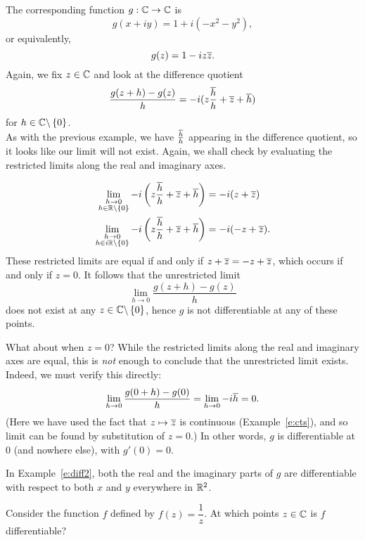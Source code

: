 \begin{solution}
The corresponding function $g: \mathbb{C} \to \mathbb{C}$ is
\[
g(x+iy) = 1+i(-x^2-y^2),
\]
or equivalently,
\[
g(z) = 1-i z \overline{z}.
\]
Again, we fix $z \in \mathbb{C}$ and look at the difference quotient
\[
\frac{g(z+h)-g(z)}{h} = -i(z \frac{\overline{h}}{h}+\overline{z}+\overline{h})
\]
for $h \in \mathbb{C} \backslash \left\{0\right\}$.\\

As with the previous example, we have $\frac{\overline{h}}{h}$ appearing in the difference quotient, so it looks like our limit will not exist.  Again, we shall check by evaluating the restricted limits along the real and imaginary axes.

\begin{align*}
\displaystyle \lim_{\substack{h \to 0 \\ h \in \mathbb{R} \backslash \left\{0\right\}}} -i \left( z \frac{\overline{h}}{h} + \overline{z} + \overline{h} \right) & = -i(z + \overline{z} ) \\
\displaystyle \lim_{\substack{h \to 0 \\ h \in i\mathbb{R} \backslash \left\{0\right\}}} -i \left( z \frac{\overline{h}}{h} + \overline{z} + \overline{h} \right) & = -i (-z+\overline{z} ).
\end{align*}
These restricted limits are equal if and only if $z+\overline{z} = -z + \overline{z}$, which occurs if and only if $z=0$.  It follows that the unrestricted limit
\[
\lim_{h \to 0} \frac{g(z+h)-g(z)}{h}
\]
does not exist at any $z \in \mathbb{C} \backslash \left\{0\right\}$, hence $g$ is not differentiable at any of these points.

What about when $z=0$?  While the restricted limits along the real and imaginary axes are equal, this is \emph{not} enough to conclude that the unrestricted limit exists.  Indeed, we must verify this directly:
\[
\lim_{h \to 0} \frac{g(0+h)-g(0)}{h} = \lim_{h \to 0} -i \overline{h} = 0.
\]
(Here we have used the fact that $z \mapsto \overline{z}$ is continuous (Example~\ref{e:cts}), and so limit can be found by substitution of $z=0$.)  In other words, $g$ is differentiable at $0$ (and nowhere else), with $g'(0)=0$.
\end{solution}
\begin{note}
In Example~\ref{e:diff2}, both the real and the imaginary parts of $g$ are differentiable with respect to both $x$ and $y$ everywhere in $\mathbb{R}^2$.
\end{note}


\begin{example}
\label{e:diff3}
Consider the function $f$ defined by $f(z)=\dfrac{1}{z}$.  At which points $z \in \mathbb{C}$ is $f$ differentiable?
\end{example}

